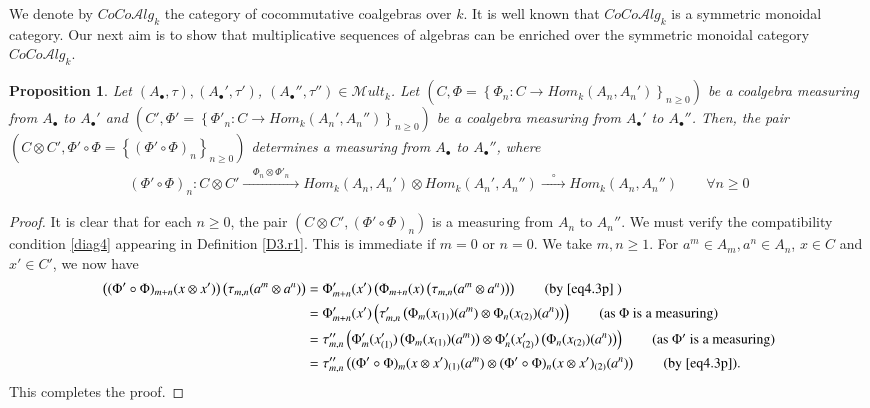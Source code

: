 \documentclass[10pt, colorlinks]{article}
\numberwithin{equation}{section} \DeclareMathSizes{2}{10}{12}{13}
\newtheorem{thm}{Proposition}[section]
\begin{document}
    
    We denote by $CoCo\mathcal Alg_k$  the category of cocommutative coalgebras over $k$. It is well known that $CoCo\mathcal Alg_k$ is a symmetric monoidal category. Our next aim is to show that multiplicative sequences of algebras can be enriched over the symmetric monoidal category $CoCo\mathcal Alg_k$.


    
    \begin{thm}\label{Prop4.2}
        Let $(A_\bullet,\tau),( A_\bullet',\tau')$, $(A_\bullet'',\tau'')\in \mathscr{M}ult_k$. Let $\left(C,\Phi=\left\{\Phi_n:C\longrightarrow Hom_k(A_n,A_n')\right\}_{n\geq 0}\right)$ be a coalgebra measuring from $A_\bullet$ to $A_\bullet'$ and $\left(C',\Phi'=\left\{\Phi'_n:C\longrightarrow Hom_k(A_n',A_n'')\right\}_{n\geq 0}\right)$ be a coalgebra measuring from  $A_\bullet'$ to $A_\bullet''$. Then, the pair $\left(C\otimes C', \Phi'\circ\Phi=\left\{ (\Phi'\circ\Phi)_n\right\}_{n\geq 0}\right)$ determines a measuring from $A_\bullet$ to $A_\bullet''$, where 
        \begin{equation}\label{eq4.3p}
        \begin{array}{c}
              (\Phi'\circ\Phi)_n:C\otimes C'\xrightarrow{\quad\Phi_n\otimes \Phi'_n\quad} {Hom}_k(A_n,A_n')\otimes  {Hom}_k(A_n',A_n'')\xrightarrow{\quad\circ\quad} {Hom}_k(A_n,A_n'')\qquad \forall n\geq 0
        \end{array}
        \end{equation}
    \end{thm}


    
    \begin{proof}
        It is clear that for each $n\geq 0$, the pair $(C\otimes C',(\Phi'\circ\Phi)_n)$ is a measuring from $A_n$ to $A_n''$. We must verify the compatibility condition  \eqref{diag4} appearing in 
        Definition \ref{D3.r1}. This is immediate if $m=0$ or $n=0$. We take $m,n\geq 1$. For   $a^m\in A_m,a^n\in A_n$, $ x\in C$ and $x'\in C'$, we now have
        \begin{align*}
            \left((\Phi'\circ\Phi)_{m+n}(x\otimes x')\right)\left(\tau_{m,n}(a^m\otimes a^n)\right)
            & =\Phi'_{m+n}(x')\left( \Phi_{m+n}(x)\left(\tau_{m,n}(a^m\otimes a^n)\right)\right) \tag{by   \eqref{eq4.3p} }\\
            &=\Phi'_{m+n}(x')\left(\tau_{m,n}'\left(\Phi_m(x_{(1)})(a^m)\otimes \Phi_n(x_{(2)})(a^n)\right)\right)\tag{as $\Phi$ is a measuring}\\
            &=\tau_{m,n}'' \left(\Phi'_m(x_{(1)}')\left(\Phi_m(x_{(1)})(a^m)\right)\otimes\Phi'_n(x_{(2)}')\left( \Phi_n(x_{(2)})(a^n)\right)\right)\tag{as $\Phi'$ is a measuring}\\
            &=\tau_{m,n}'' \left((\Phi'\circ\Phi)_{m}(x\otimes x')_{(1)}(a^m)\otimes (\Phi'\circ\Phi)_{n}(x\otimes x')_{(2)}(a^n)\right)\tag{by \eqref{eq4.3p}}.
        \end{align*}
        This completes the proof.
    \end{proof}
\end{document}
